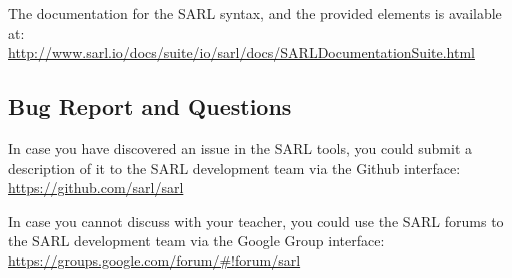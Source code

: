 The documentation for the SARL syntax, and the provided elements is available at:\\
\url{http://www.sarl.io/docs/suite/io/sarl/docs/SARLDocumentationSuite.html}

\subsection{Bug Report and Questions}

In case you have discovered an issue in the SARL tools, you could submit a description of it to the SARL development team via the Github interface:\\
\url{https://github.com/sarl/sarl}

In case you cannot discuss with your teacher, you could use the SARL forums to the SARL development team via the Google Group interface:\\
\url{https://groups.google.com/forum/#!forum/sarl}

